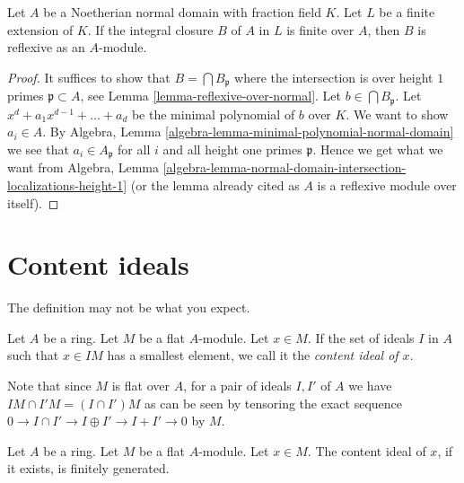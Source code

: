 \begin{lemma}
\label{lemma-integral-closure-reflexive}
Let $A$ be a Noetherian normal domain with fraction field $K$.
Let $L$ be a finite extension of $K$. If the integral closure
$B$ of $A$ in $L$ is finite over $A$, then $B$ is reflexive as an $A$-module.
\end{lemma}

\begin{proof}
It suffices to show that $B = \bigcap B_\mathfrak p$ where the intersection
is over height $1$ primes $\mathfrak p \subset A$, see
Lemma \ref{lemma-reflexive-over-normal}.
Let $b \in \bigcap B_\mathfrak p$. Let $x^d + a_1x^{d - 1} + \ldots + a_d$
be the minimal polynomial of $b$ over $K$.
We want to show $a_i \in A$.
By Algebra, Lemma \ref{algebra-lemma-minimal-polynomial-normal-domain}
we see that $a_i \in A_\mathfrak p$ for all $i$ and all height one primes
$\mathfrak p$. Hence we get what we want from
Algebra, Lemma
\ref{algebra-lemma-normal-domain-intersection-localizations-height-1}
(or the lemma already cited as $A$ is a reflexive module over itself).
\end{proof}








\section{Content ideals}
\label{section-content}

\noindent
The definition may not be what you expect.

\begin{definition}
\label{definition-content-ideal}
Let $A$ be a ring. Let $M$ be a flat $A$-module. Let $x \in M$.
If the set of ideals $I$ in $A$ such that $x \in IM$ has a
smallest element, we call it the {\it content ideal of $x$}.
\end{definition}

\noindent
Note that since $M$ is flat over $A$, for a pair of ideals $I, I'$
of $A$ we have $IM \cap I'M = (I \cap I')M$
as can be seen by tensoring the exact sequence
$0 \to I \cap I' \to I \oplus I' \to I + I' \to 0$ by $M$.

\begin{lemma}
\label{lemma-content-finitely-generated}
Let $A$ be a ring. Let $M$ be a flat $A$-module. Let $x \in M$.
The content ideal of $x$, if it exists, is finitely generated.
\end{lemma}

